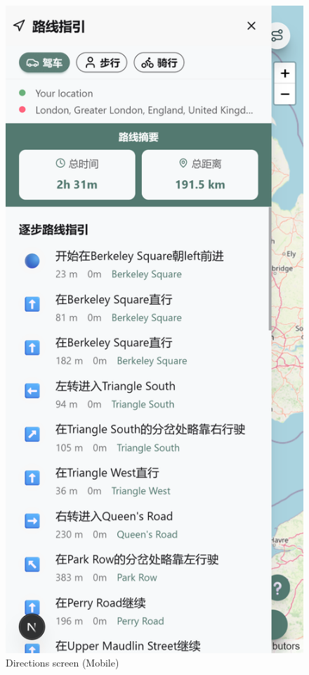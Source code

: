 \begin{figure}[H]
    \centering
    \includegraphics[height=0.3\textheight,keepaspectratio]{images/4_directions_mobile.png}
    \caption{Directions screen (Mobile)}
\end{figure}

